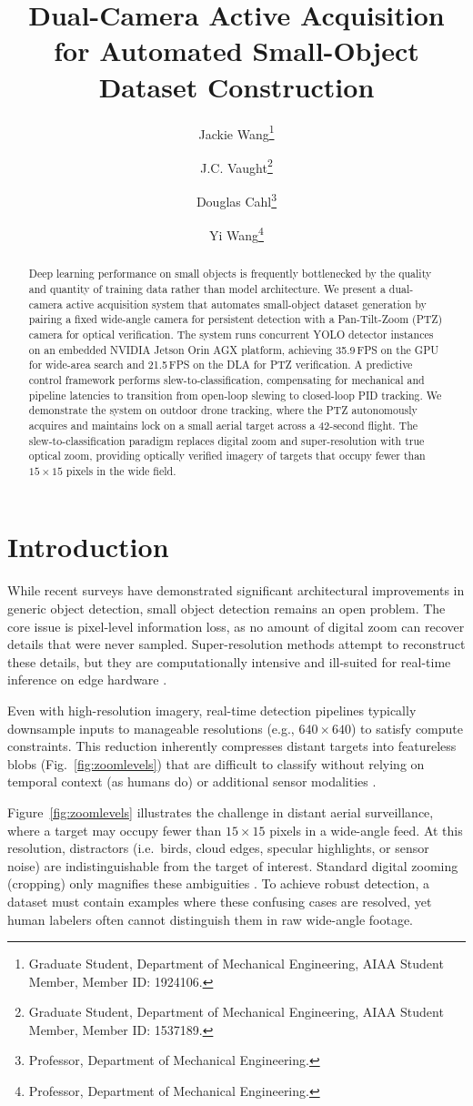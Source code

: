 \documentclass[conf]{new-aiaa}
\title{Dual-Camera Active Acquisition for Automated Small-Object Dataset Construction}
\author{Jackie Wang\footnote{Graduate Student, Department of Mechanical Engineering, AIAA Student Member, Member ID: 1924106.}}
\author{J.C. Vaught\footnote{Graduate Student, Department of Mechanical Engineering, AIAA Student Member, Member ID: 1537189.}}
\author{Douglas Cahl\footnote{Professor, Department of Mechanical Engineering.}}
\author{Yi Wang\footnote{Professor, Department of Mechanical Engineering.}}
\affil{Department of Mechanical Engineering, University of South Carolina, Columbia, SC, 29208}
\begin{document}
\maketitle

\begin{abstract}
Deep learning performance on small objects is frequently bottlenecked by the quality and quantity of training data rather than model architecture. We present a dual-camera active acquisition system that automates small-object dataset generation by pairing a fixed wide-angle camera for persistent detection with a Pan-Tilt-Zoom (PTZ) camera for optical verification. The system runs concurrent YOLO detector instances on an embedded NVIDIA Jetson Orin AGX platform, achieving 35.9\,FPS on the GPU for wide-area search and 21.5\,FPS on the DLA for PTZ verification. A predictive control framework performs slew-to-classification, compensating for mechanical and pipeline latencies to transition from open-loop slewing to closed-loop PID tracking. We demonstrate the system on outdoor drone tracking, where the PTZ autonomously acquires and maintains lock on a small aerial target across a 42-second flight. The slew-to-classification paradigm replaces digital zoom and super-resolution with true optical zoom, providing optically verified imagery of targets that occupy fewer than $15 \times 15$ pixels in the wide field.
\end{abstract}

\section{Introduction}
While recent surveys \cite{Chen2022, Nikouei2025} have demonstrated significant architectural improvements in generic object detection, small object detection remains an open problem. The core issue is pixel-level information loss, as no amount of digital zoom can recover details that were never sampled. Super-resolution methods attempt to reconstruct these details, but they are computationally intensive and ill-suited for real-time inference on edge hardware \cite{Mahaur2022}.
\par
Even with high-resolution imagery, real-time detection pipelines typically downsample inputs to manageable resolutions (e.g., $640 \times 640$) to satisfy compute constraints. This reduction inherently compresses distant targets into featureless blobs (Fig.~\ref{fig:zoomlevels}) that are difficult to classify without relying on temporal context (as humans do) or additional sensor modalities \cite{Rozantsev2017}.
\par
Figure~\ref{fig:zoomlevels} illustrates the challenge in distant aerial surveillance, where a target may occupy fewer than $15 \times 15$ pixels in a wide-angle feed. At this resolution, distractors (i.e.\ birds, cloud edges, specular highlights, or sensor noise) are indistinguishable from the target of interest. Standard digital zooming (cropping) only magnifies these ambiguities \cite{Zhang2019}. To achieve robust detection, a dataset must contain examples where these confusing cases are resolved, yet human labelers often cannot distinguish them in raw wide-angle footage.
\end{document}
